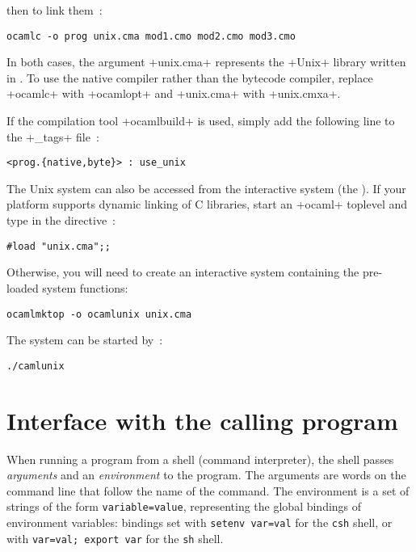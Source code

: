 then to link them~:
%
\begin{lstlisting}
ocamlc -o prog unix.cma mod1.cmo mod2.cmo mod3.cmo
\end{lstlisting}
%

In both cases, the argument \ml+unix.cma+ represents the \ml+Unix+
library written in {\ocaml}. To use the native compiler rather than the bytecode
compiler, replace \ml+ocamlc+ with \ml+ocamlopt+ and \ml+unix.cma+ with
\ml+unix.cmxa+.


If the compilation tool  \ml+ocamlbuild+ is used, simply add the
following line to the 
\ml+_tags+ file~:


%
\begin{lstlisting}
<prog.{native,byte}> : use_unix
\end{lstlisting}
%

The Unix system can also be accessed from the interactive system (the
). If your platform supports dynamic linking of C
libraries, start an \ml+ocaml+ toplevel and type in the directive~:


%
\begin{lstlisting}
#load "unix.cma";;
\end{lstlisting}
%

Otherwise, you will need to create an interactive system containing
the pre-loaded system functions:

%
\begin{lstlisting}
ocamlmktop -o ocamlunix unix.cma
\end{lstlisting}
%


The system can be started by~:
%
\begin{lstlisting}
./camlunix
\end{lstlisting}

\section{Interface with the calling program}

When running a program from a shell (command interpreter), the shell
passes \emph{arguments} and an \emph{environment} to the program.  The
arguments are words on the command line that follow the name of the
command. The environment is a set of strings of the form
\texttt{variable=value}, representing the global bindings of environment
variables: bindings set with \texttt{setenv var=val} for the
\texttt{csh} shell, or with \texttt{var=val; export var} for
the \texttt{sh} shell.




